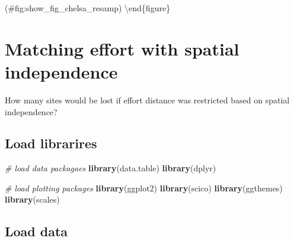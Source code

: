 \documentclass[]{article}
\newenvironment{Shaded}{}{}
\newcommand{\CommentTok}[1]{\textcolor[rgb]{0.38,0.63,0.69}{\textit{#1}}}
\newcommand{\DataTypeTok}[1]{\textcolor[rgb]{0.56,0.13,0.00}{#1}}
\newcommand{\DecValTok}[1]{\textcolor[rgb]{0.25,0.63,0.44}{#1}}
\newcommand{\ErrorTok}[1]{\textcolor[rgb]{1.00,0.00,0.00}{\textbf{#1}}}
\newcommand{\FloatTok}[1]{\textcolor[rgb]{0.25,0.63,0.44}{#1}}
\newcommand{\KeywordTok}[1]{\textcolor[rgb]{0.00,0.44,0.13}{\textbf{#1}}}
\newcommand{\NormalTok}[1]{#1}
\newcommand{\OperatorTok}[1]{\textcolor[rgb]{0.40,0.40,0.40}{#1}}
\newcommand{\OtherTok}[1]{\textcolor[rgb]{0.00,0.44,0.13}{#1}}
\newcommand{\StringTok}[1]{\textcolor[rgb]{0.25,0.44,0.63}{#1}}
\begin{document}
(\#fig:show\_fig\_chelsa\_resamp)
\textbackslash{}end\{figure\}

\hypertarget{matching-effort-with-spatial-independence}{%
\section{Matching effort with spatial independence}\label{matching-effort-with-spatial-independence}}

How many sites would be lost if effort distance was restricted based on spatial independence?

\hypertarget{load-librarires}{%
\subsection{Load librarires}\label{load-librarires}}

\begin{Shaded}
\begin{Highlighting}[]
\CommentTok{# load data packagaes}
\KeywordTok{library}\NormalTok{(data.table)}
\KeywordTok{library}\NormalTok{(dplyr)}

\CommentTok{# load plotting packages}
\KeywordTok{library}\NormalTok{(ggplot2)}
\KeywordTok{library}\NormalTok{(scico)}
\KeywordTok{library}\NormalTok{(ggthemes)}
\KeywordTok{library}\NormalTok{(scales)}
\end{Highlighting}
\end{Shaded}

\hypertarget{load-data}{%
\subsection{Load data}\label{load-data}}

\begin{Shaded}
\end{Shaded}
\end{document}

